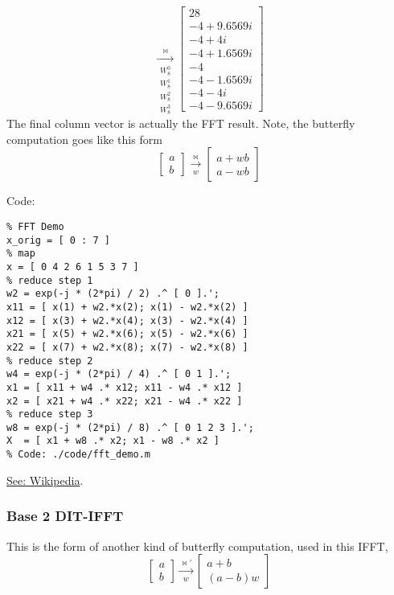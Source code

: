 \[\xrightarrow[\substack{W_8^0\\W_8^1\\W_8^2\\W_8^3}]{\bowtie}
\begin{bmatrix}
   28\\
   -4 +  9.6569i\\
   -4 +  4i\\
   -4 +  1.6569i\\
   -4\\
   -4 -  1.6569i\\
   -4 -  4i\\
   -4 -  9.6569i
\end{bmatrix}
\]
The final column vector is actually the FFT result. Note, the butterfly computation goes like this form
\[ \begin{bmatrix} a \\ b \end{bmatrix} \xrightarrow[w]{\bowtie}
 \begin{bmatrix} a + wb \\ a - wb \end{bmatrix}
\]

Code:
{\footnotesize%
\begin{lstlisting}[caption={FFT Demo},numbers=none]
%!/usr/bin/octave
% FFT Demo
x_orig = [ 0 : 7 ]
% map
x = [ 0 4 2 6 1 5 3 7 ]
% reduce step 1
w2 = exp(-j * (2*pi) / 2) .^ [ 0 ].';
x11 = [ x(1) + w2.*x(2); x(1) - w2.*x(2) ]
x12 = [ x(3) + w2.*x(4); x(3) - w2.*x(4) ]
x21 = [ x(5) + w2.*x(6); x(5) - w2.*x(6) ]
x22 = [ x(7) + w2.*x(8); x(7) - w2.*x(8) ]
% reduce step 2
w4 = exp(-j * (2*pi) / 4) .^ [ 0 1 ].';
x1 = [ x11 + w4 .* x12; x11 - w4 .* x12 ]
x2 = [ x21 + w4 .* x22; x21 - w4 .* x22 ]
% reduce step 3
w8 = exp(-j * (2*pi) / 8) .^ [ 0 1 2 3 ].';
X  = [ x1 + w8 .* x2; x1 - w8 .* x2 ]
% Code: ./code/fft_demo.m
\end{lstlisting}
}
\href{https://en.wikipedia.org/wiki/Cooley-Tukey_FFT_algorithm|}
{See: Wikipedia}.

\subsubsection{Base 2 DIT-IFFT}

This is the form of another kind of butterfly computation, used in this IFFT,
\[ \begin{bmatrix} a \\ b \end{bmatrix} \xrightarrow[w]{\bowtie\prime}
 \begin{bmatrix} a + b \\ (a - b)w \end{bmatrix}
\]

